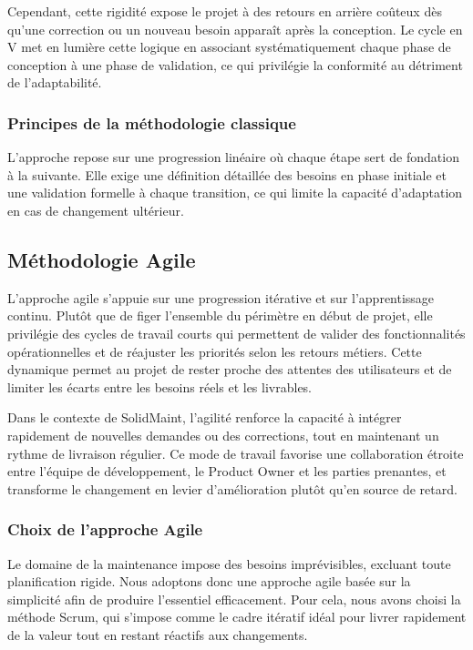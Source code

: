 Cependant, cette rigidité expose le projet à des retours en arrière coûteux dès qu'une correction ou un nouveau besoin apparaît après la conception. Le cycle en V met en lumière cette logique en associant systématiquement chaque phase de conception à une phase de validation, ce qui privilégie la conformité au détriment de l'adaptabilité.\cite{brandenbourg-gestion}

\subsubsection{Principes de la méthodologie classique}
L'approche repose sur une progression linéaire où chaque étape sert de fondation à la suivante. Elle exige une définition détaillée des besoins en phase initiale et une validation formelle à chaque transition, ce qui limite la capacité d'adaptation en cas de changement ultérieur.



\subsection{Méthodologie Agile}
L'approche agile s'appuie sur une progression itérative et sur l'apprentissage continu. Plutôt que de figer l'ensemble du périmètre en début de projet, elle privilégie des cycles de travail courts qui permettent de valider des fonctionnalités opérationnelles et de réajuster les priorités selon les retours métiers. Cette dynamique permet au projet de rester proche des attentes des utilisateurs et de limiter les écarts entre les besoins réels et les livrables.

Dans le contexte de SolidMaint, l'agilité renforce la capacité à intégrer rapidement de nouvelles demandes ou des corrections, tout en maintenant un rythme de livraison régulier. Ce mode de travail favorise une collaboration étroite entre l'équipe de développement, le Product Owner et les parties prenantes, et transforme le changement en levier  \newline d'amélioration plutôt qu'en source de retard. \cite{agile-manifesto}




\subsubsection{Choix de l’approche Agile}
Le domaine de la maintenance impose des besoins imprévisibles, excluant toute planification rigide. Nous adoptons donc une approche agile basée sur la simplicité afin de produire l'essentiel efficacement. Pour cela, nous avons choisi la méthode Scrum, qui s'impose comme le cadre itératif idéal pour livrer rapidement de la valeur tout en restant réactifs aux changements.
